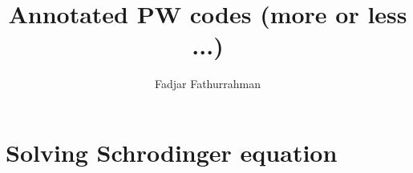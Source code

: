 \documentclass[a4paper,10pt]{extarticle}
\begin{document}
\title{Annotated PW codes (more or less ...)}
\author{Fadjar Fathurrahman}
\date{}
\maketitle







\section{Solving Schrodinger equation}
\end{document}
